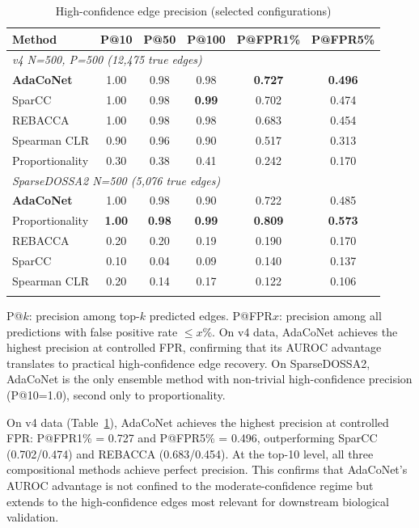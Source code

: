 \documentclass[unnumsec,webpdf,contemporary,large,numbered]{oup-authoring-template}
\theoremstyle{plain}
\theoremstyle{definition}
\begin{document}
\begin{table}[!t]
\caption{High-confidence edge precision (selected configurations)}\label{tab:topk}
\centering
\small
\setlength{\tabcolsep}{3pt}
\begin{tabular}{@{}lccccc@{}}
\toprule
\textbf{Method} & \textbf{P@10} & \textbf{P@50} & \textbf{P@100} & \textbf{P@FPR1\%} & \textbf{P@FPR5\%} \\
\midrule
\multicolumn{6}{l}{\textit{v4 N=500, P=500 (12{,}475 true edges)}} \\
\textbf{AdaCoNet} & 1.00 & 0.98 & 0.98 & \textbf{0.727} & \textbf{0.496} \\
SparCC            & 1.00 & 0.98 & \textbf{0.99} & 0.702 & 0.474 \\
REBACCA           & 1.00 & 0.98 & 0.98 & 0.683 & 0.454 \\
Spearman CLR      & 0.90 & 0.96 & 0.90 & 0.517 & 0.313 \\
Proportionality   & 0.30 & 0.38 & 0.41 & 0.242 & 0.170 \\
\midrule
\multicolumn{6}{l}{\textit{SparseDOSSA2 N=500 (5{,}076 true edges)}} \\
\textbf{AdaCoNet} & 1.00 & 0.98 & 0.90 & 0.722 & 0.485 \\
Proportionality   & \textbf{1.00} & \textbf{0.98} & \textbf{0.99} & \textbf{0.809} & \textbf{0.573} \\
REBACCA           & 0.20 & 0.20 & 0.19 & 0.190 & 0.170 \\
SparCC            & 0.10 & 0.04 & 0.09 & 0.140 & 0.137 \\
Spearman CLR      & 0.20 & 0.14 & 0.17 & 0.122 & 0.106 \\
\botrule
\end{tabular}
\begin{tablenotes}
\small
P@$k$: precision among top-$k$ predicted edges. P@FPR$x$: precision among all predictions with false positive rate $\leq x\%$. On v4 data, AdaCoNet achieves the highest precision at controlled FPR, confirming that its AUROC advantage translates to practical high-confidence edge recovery. On SparseDOSSA2, AdaCoNet is the only ensemble method with non-trivial high-confidence precision (P@10=1.0), second only to proportionality.
\end{tablenotes}
\end{table}

On v4 data (Table~\ref{tab:topk}), AdaCoNet achieves the highest precision at controlled FPR: P@FPR1\% = 0.727 and P@FPR5\% = 0.496, outperforming SparCC (0.702/0.474) and REBACCA (0.683/0.454). At the top-10 level, all three compositional methods achieve perfect precision. This confirms that AdaCoNet's AUROC advantage is not confined to the moderate-confidence regime but extends to the high-confidence edges most relevant for downstream biological validation.
\end{document}
